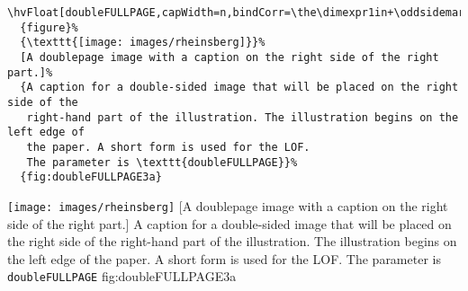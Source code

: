 \documentclass[twoside]{scrartcl}
\let\hvBlindtext\Blindtext
\def\Blindtext{\par\color{black!40}\hvBlindtext\par\normalcolor}
\begin{document}
\begin{lstlisting}
\hvFloat[doubleFULLPAGE,capWidth=n,bindCorr=\the\dimexpr1in+\oddsidemargin]%
  {figure}%
  {\texttt{[image: images/rheinsberg]}}%
  [A doublepage image with a caption on the right side of the right part.]%
  {A caption for a double-sided image that will be placed on the right side of the
   right-hand part of the illustration. The illustration begins on the left edge of 
   the paper. A short form is used for the LOF. 
   The parameter is \texttt{doubleFULLPAGE}}%
  {fig:doubleFULLPAGE3a}
\end{lstlisting}

%
  {\texttt{[image: images/rheinsberg]}}%
  [A doublepage image with a caption on the right side of the right part.]%
  {A caption for a double-sided image that will be placed on the right side of the
   right-hand part of the illustration. The illustration begins on the left edge of 
   the paper. A short form is used for the LOF. 
   The parameter is \texttt{doubleFULLPAGE}}%
  {fig:doubleFULLPAGE3a}


\Blindtext

\Blindtext
\end{document}
